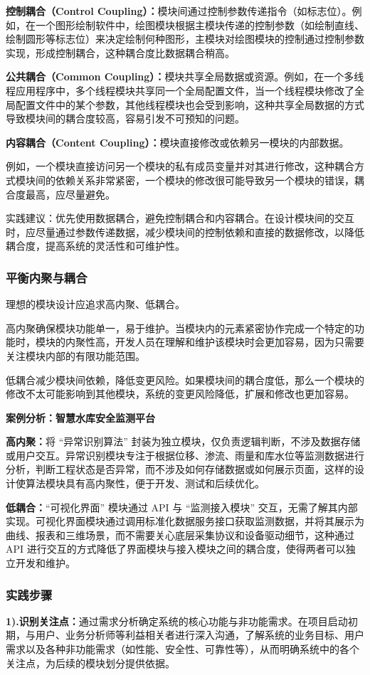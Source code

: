 \textbf{控制耦合（Control Coupling）：}模块间通过控制参数传递指令（如标志位）。例如，在一个图形绘制软件中，绘图模块根据主模块传递的控制参数（如绘制直线、绘制圆形等标志位）来决定绘制何种图形，主模块对绘图模块的控制通过控制参数实现，形成控制耦合，这种耦合度比数据耦合稍高。

\textbf{公共耦合（Common Coupling）：}模块共享全局数据或资源。例如，在一个多线程应用程序中，多个线程模块共享同一个全局配置文件，当一个线程模块修改了全局配置文件中的某个参数，其他线程模块也会受到影响，这种共享全局数据的方式导致模块间的耦合度较高，容易引发不可预知的问题。

\textbf{内容耦合（Content Coupling）：}模块直接修改或依赖另一模块的内部数据。

例如，一个模块直接访问另一个模块的私有成员变量并对其进行修改，这种耦合方式模块间的依赖关系非常紧密，一个模块的修改很可能导致另一个模块的错误，耦合度最高，应尽量避免。

实践建议：优先使用数据耦合，避免控制耦合和内容耦合。在设计模块间的交互时，应尽量通过参数传递数据，减少模块间的控制依赖和直接的数据修改，以降低耦合度，提高系统的灵活性和可维护性。

\subsubsection{平衡内聚与耦合}
理想的模块设计应追求高内聚、低耦合。

高内聚确保模块功能单一，易于维护。当模块内的元素紧密协作完成一个特定的功能时，模块的内聚性高，开发人员在理解和维护该模块时会更加容易，因为只需要关注模块内部的有限功能范围。

低耦合减少模块间依赖，降低变更风险。如果模块间的耦合度低，那么一个模块的修改不太可能影响到其他模块，系统的变更风险降低，扩展和修改也更加容易。

\textbf{案例分析：智慧水库安全监测平台}

\textbf{高内聚：}将 “异常识别算法” 封装为独立模块，仅负责逻辑判断，不涉及数据存储或用户交互。异常识别模块专注于根据位移、渗流、雨量和库水位等监测数据进行分析，判断工程状态是否异常，而不涉及如何存储数据或如何展示页面，这样的设计使算法模块具有高内聚性，便于开发、测试和后续优化。

\textbf{低耦合：}“可视化界面” 模块通过 API 与 “监测接入模块” 交互，无需了解其内部实现。可视化界面模块通过调用标准化数据服务接口获取监测数据，并将其展示为曲线、报表和三维场景，而不需要关心底层采集协议和设备驱动细节，这种通过 API 进行交互的方式降低了界面模块与接入模块之间的耦合度，使得两者可以独立开发和维护。

\subsubsection{实践步骤}
\textbf{1).识别关注点：}通过需求分析确定系统的核心功能与非功能需求。在项目启动初期，与用户、业务分析师等利益相关者进行深入沟通，了解系统的业务目标、用户需求以及各种非功能需求（如性能、安全性、可靠性等），从而明确系统中的各个关注点，为后续的模块划分提供依据。

